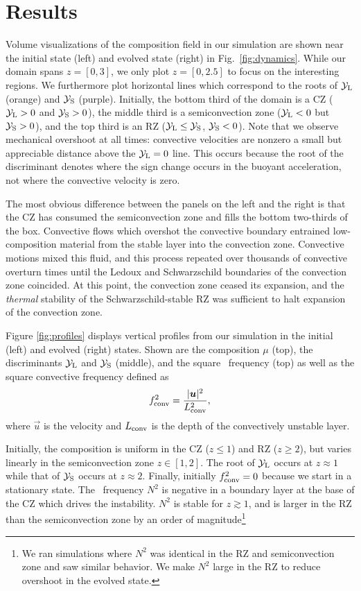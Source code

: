 \section{Results}
\label{sec:result}


Volume visualizations of the composition field in our simulation are shown near the initial state (left) and evolved state (right) in Fig.~\ref{fig:dynamics}.
While our domain spans $z = [0, 3]$, we only plot $z = [0, 2.5]$ to focus on the interesting regions.
We furthermore plot horizontal lines which correspond to the roots of $\mathcal{Y}_{\rm{L}}$ (orange) and $\mathcal{Y}_{\rm{S}}$ (purple).
Initially, the bottom third of the domain is a CZ ($\mathcal{Y}_{\rm{L}} > 0$ and $\mathcal{Y}_{\rm{S}} > 0$), the middle third is a semiconvection zone ($\mathcal{Y}_{\rm{L}} < 0$ but $\mathcal{Y}_{\rm{S}} > 0$), and the top third is an RZ ($\mathcal{Y}_{\rm{L}} \leq \mathcal{Y}_{\rm{S}}$, $\mathcal{Y}_{\rm{S}} < 0$). 
Note that we observe mechanical overshoot at all times: convective velocities are nonzero a small but appreciable distance above the $\mathcal{Y}_{\rm{L}} = 0$ line.
This occurs because the root of the discriminant denotes where the sign change occurs in the buoyant acceleration, not where the convective velocity is zero.

The most obvious difference between the panels on the left and the right is that the CZ has consumed the semiconvection zone and fills the bottom two-thirds of the box.
Convective flows which overshot the convective boundary entrained low-composition material from the stable layer into the convection zone.
Convective motions mixed this fluid, and this process repeated over thousands of convective overturn times until the Ledoux and Schwarzschild boundaries of the convection zone coincided.
At this point, the convection zone ceased its expansion, and the \emph{thermal} stability of the Schwarzschild-stable RZ was sufficient to halt expansion of the convection zone.

Figure \ref{fig:profiles} displays vertical profiles from our simulation in the initial (left) and evolved (right) states.
Shown are the composition $\mu$ (top), the discriminants $\mathcal{Y}_{\rm{L}}$ and $\mathcal{Y}_{\rm{S}}$ (middle), and the square \brunt$\,$ frequency (top) as well as the square convective frequency defined as
\begin{equation}
f_{\rm{conv}}^2 = \frac{|\vec{u}|^2}{L_{\rm{conv}}^2},
\label{eqn:fconv2}
\end{equation}
where $\vec{u}$ is the velocity and $L_{\rm{conv}}$ is the depth of the convectively unstable layer.

Initially, the composition is uniform in the CZ ($z \leq 1$) and RZ ($z \geq 2$), but varies linearly in the semiconvection zone $z \in [1, 2]$.
The root of $\mathcal{Y}_{\rm{L}}$ occurs at $z \approx 1$ while that of $\mathcal{Y}_{\rm{S}}$ occurs at $z \approx 2$.
Finally, initially $f_{\rm{conv}}^2 = 0$ because we start in a stationary state.
The \brunt$\,$ frequency $N^2$ is negative in a boundary layer at the base of the CZ which drives the instability.
$N^2$ is stable for $z \gtrsim 1$, and is larger in the RZ than the semiconvection zone by an order of magnitude\footnote{We ran simulations where $N^2$ was identical in the RZ and semiconvection zone and saw similar behavior.
We make $N^2$ large in the RZ to reduce overshoot in the evolved state.}


